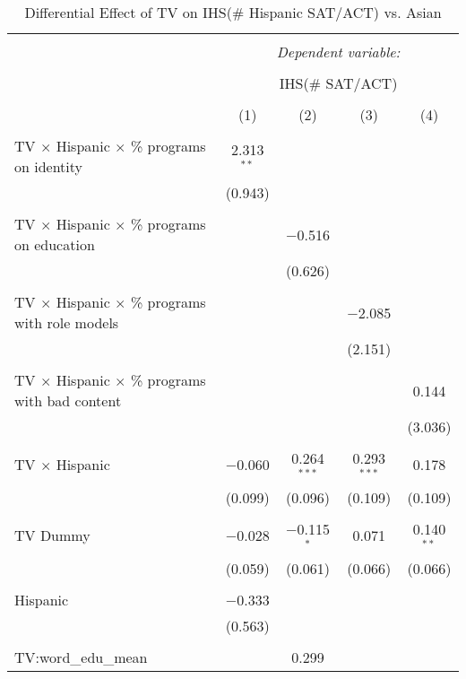 
\begin{table}[!htbp] \centering 
  \caption{Differential Effect of TV on IHS(\# Hispanic SAT/ACT) vs. Asian} 
  \label{} 
\begin{tabular}{@{\extracolsep{-2pt}}lcccc} 
\\[-1.8ex]\hline 
\hline \\[-1.8ex] 
 & \multicolumn{4}{c}{\textit{Dependent variable:}} \\ 
\cline{2-5} 
\\[-1.8ex] & \multicolumn{4}{c}{IHS(\# SAT/ACT)} \\ 
\\[-1.8ex] & (1) & (2) & (3) & (4)\\ 
\hline \\[-1.8ex] 
 TV $\times$ Hispanic $\times$ \% programs on identity & 2.313$^{**}$ &  &  &  \\ 
  & (0.943) &  &  &  \\ 
  & & & & \\ 
 TV $\times$ Hispanic $\times$ \% programs on education &  & $-$0.516 &  &  \\ 
  &  & (0.626) &  &  \\ 
  & & & & \\ 
 TV $\times$ Hispanic $\times$ \% programs with role models &  &  & $-$2.085 &  \\ 
  &  &  & (2.151) &  \\ 
  & & & & \\ 
 TV $\times$ Hispanic $\times$ \% programs with bad content &  &  &  & 0.144 \\ 
  &  &  &  & (3.036) \\ 
  & & & & \\ 
 TV $\times$ Hispanic & $-$0.060 & 0.264$^{***}$ & 0.293$^{***}$ & 0.178 \\ 
  & (0.099) & (0.096) & (0.109) & (0.109) \\ 
  & & & & \\ 
 TV Dummy & $-$0.028 & $-$0.115$^{*}$ & 0.071 & 0.140$^{**}$ \\ 
  & (0.059) & (0.061) & (0.066) & (0.066) \\ 
  & & & & \\ 
 Hispanic & $-$0.333 &  &  &  \\ 
  & (0.563) &  &  &  \\ 
  & & & & \\ 
 TV:word\_edu\_mean &  & 0.299 &  &  \\ 

\end{tabular}
\end{table}
